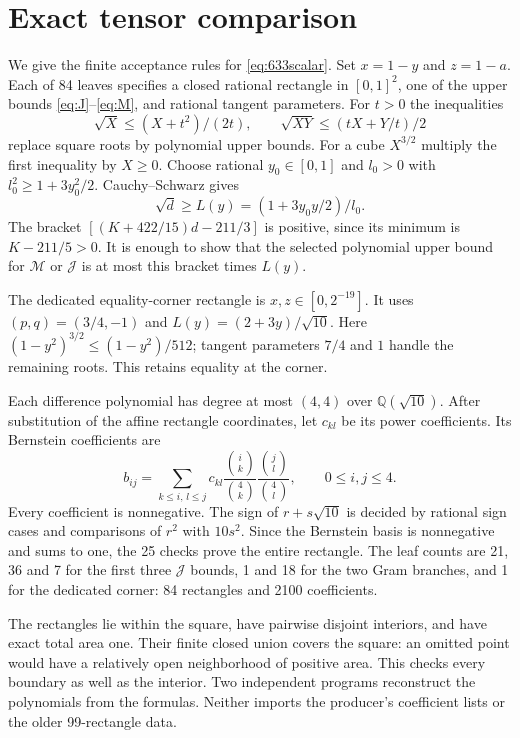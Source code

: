 \documentclass[11pt]{article}
\begin{document}
\appendix
\section{Exact tensor comparison}\label{app:tensor}
We give the finite acceptance rules for \eqref{eq:633scalar}.
Set $x=1-y$ and $z=1-a$. Each of 84 leaves specifies a closed rational
rectangle in $[0,1]^2$, one of the upper bounds \eqref{eq:J}--\eqref{eq:M},
and rational tangent parameters. For $t>0$ the inequalities
\[
 \sqrt X\le(X+t^2)/(2t),\qquad
 \sqrt{XY}\le(tX+Y/t)/2
\]
replace square roots by polynomial upper bounds. For a cube $X^{3/2}$
multiply the first inequality by $X\ge0$.
Choose rational $y_0\in[0,1]$ and $l_0>0$ with
$l_0^2\ge1+3y_0^2/2$. Cauchy--Schwarz gives
\[
 \sqrt d\ge L(y)=(1+3y_0y/2)/l_0.
\]
The bracket $[(K+422/15)d-211/3]$ is positive, since its minimum
is $K-211/5>0$. It is enough to show that the selected polynomial upper
bound for $\mathcal M$ or $\mathcal J$ is at most this bracket times
$L(y)$.

The dedicated equality-corner rectangle is
$x,z\in[0,2^{-19}]$. It uses $(p,q)=(3/4,-1)$ and
$L(y)=(2+3y)/\sqrt{10}$. Here
$(1-y^2)^{3/2}\le(1-y^2)/512$; tangent parameters $7/4$ and $1$
handle the remaining roots. This retains equality at the corner.

Each difference polynomial has degree at most $(4,4)$ over
$\mathbb Q(\sqrt{10})$. After substitution of the affine rectangle
coordinates, let $c_{kl}$ be its power coefficients. Its Bernstein
coefficients are
\[
 b_{ij}=\sum_{k\le i,\,l\le j}c_{kl}
 \frac{\binom ik}{\binom4k}\frac{\binom jl}{\binom4l},
 \qquad 0\le i,j\le4.
\]
Every coefficient is nonnegative. The sign of $r+s\sqrt{10}$ is
decided by rational sign cases and comparisons of $r^2$ with $10s^2$.
Since the Bernstein basis is nonnegative and sums to one, the 25 checks
prove the entire rectangle. The leaf counts are 21, 36 and 7 for the
first three $\mathcal J$ bounds, 1 and 18 for the two Gram branches,
and 1 for the dedicated corner: 84 rectangles and 2100 coefficients.

The rectangles lie within the square, have pairwise disjoint interiors,
and have exact total area one. Their finite closed union covers the square:
an omitted point would have a relatively open neighborhood of positive
area. This checks every boundary as well as the interior. Two independent
programs reconstruct the polynomials from the formulas. Neither imports
the producer's coefficient lists or the older 99-rectangle data.
\end{document}

